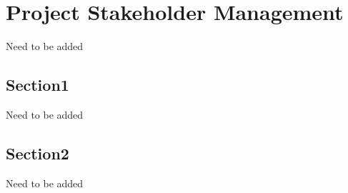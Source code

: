 \chapter{Project Stakeholder Management}
Need to be added
\section{Section1}
Need to be added
\section{Section2}
Need to be added

\FloatBarrier
\newpage